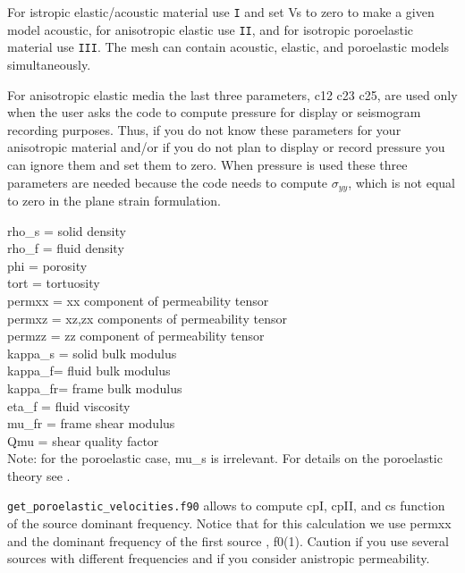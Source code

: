 \documentclass[oneside,english,onecolumn,letterpaper]{book}
\begin{document}
\begin{description}
For istropic elastic/acoustic material use \texttt{I} and set Vs to zero to make a given model acoustic, for anisotropic elastic use \texttt{II},
and for isotropic poroelastic material use \texttt{III}. The mesh can contain acoustic, elastic, and poroelastic models simultaneously.

For anisotropic elastic media the last three parameters, c12 c23 c25, are used only when the user asks the code to compute pressure for display
or seismogram recording purposes. Thus, if you do not know these parameters for your anisotropic material and/or if you do not plan to display or record pressure you
can ignore them and set them to zero. When pressure is used these three parameters are needed because the code needs to compute $\sigma_{yy}$,
which is not equal to zero in the plane strain formulation.

rho\_s = solid density\\
rho\_f = fluid density\\
phi = porosity\\
tort = tortuosity\\
permxx = xx component of permeability tensor\\
permxz = xz,zx components of permeability tensor\\
permzz = zz component of permeability tensor\\
kappa\_s = solid bulk modulus\\
kappa\_f= fluid bulk modulus\\
kappa\_fr= frame bulk modulus\\
eta\_f = fluid viscosity\\
mu\_fr = frame shear modulus\\
Qmu = shear quality factor\\

Note: for the poroelastic case, mu\_s is irrelevant.
For details on the poroelastic theory see \cite{MoTr08}.

\end{description}

\texttt{get\_poroelastic\_velocities.f90} allows to compute cpI, cpII, and cs function of
the source dominant frequency. Notice that for this calculation we use permxx
and the dominant frequency of the first source , f0(1). Caution if you use
several sources with different frequencies and if you consider anistropic
permeability.

\end{document}
